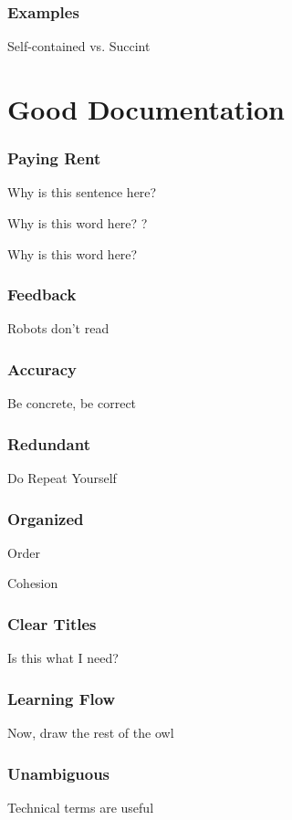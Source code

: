 \begin{frame}
\frametitle{Examples}

Self-contained vs. Succint
\end{frame}

\section{Good Documentation}


\begin{frame}
\frametitle{Paying Rent}

Why is this sentence here?

Why is this word here?
?

Why is this word here?

\end{frame}

\begin{frame}
\frametitle{Feedback}

Robots don't read
\end{frame}


\begin{frame}
\frametitle{Accuracy}

Be concrete, be correct

\end{frame}

\begin{frame}
\frametitle{Redundant}

Do Repeat Yourself
\end{frame}


\begin{frame}
\frametitle{Organized}

Order

Cohesion
\end{frame}

\begin{frame}
\frametitle{Clear Titles}

Is this what I need?
\end{frame}


\begin{frame}
\frametitle{Learning Flow}

Now, draw the rest of the owl
\end{frame}


\begin{frame}
\frametitle{Unambiguous}

Technical terms are useful
\end{frame}

